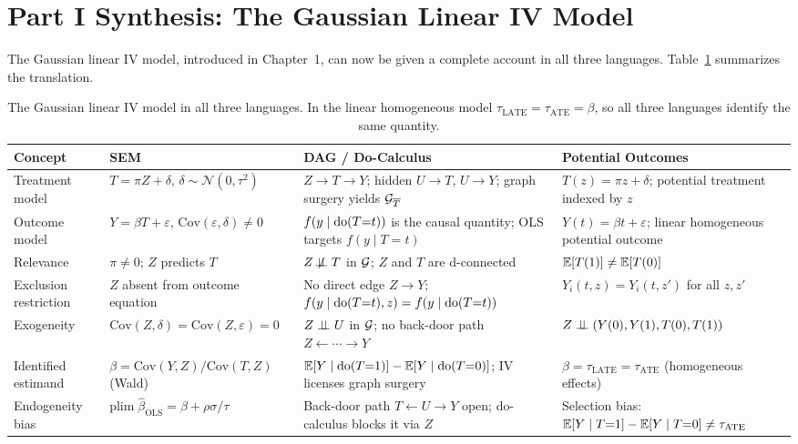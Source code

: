 \documentclass[master.tex]{subfiles}
\begin{document}
\section{Part I Synthesis: The Gaussian Linear IV Model}
\label{w4:sec:synthesis}

The Gaussian linear IV model, introduced in Chapter~1, can now be given a
complete account in all three languages.  Table~\ref{w4:tab:synthesis}
summarizes the translation.

\begin{table}[h]
\centering
\small
\renewcommand{\arraystretch}{1.5}
\begin{tabular}{@{}p{2.6cm}p{3.6cm}p{4.2cm}p{3.6cm}@{}}
\toprule
\textbf{Concept}
  & \textbf{SEM}
  & \textbf{DAG / Do-Calculus}
  & \textbf{Potential Outcomes} \\
\midrule
Treatment model
  & $T = \pi Z + \delta$,\; $\delta \sim \mathcal{N}(0,\tau^2)$
  & $Z\to T\to Y$; hidden $U\to T$, $U\to Y$; graph surgery yields $\mathcal{G}_{\overline{T}}$
  & $T(z) = \pi z + \delta$; potential treatment indexed by $z$ \\
Outcome model
  & $Y = \beta T + \varepsilon$,\; $\mathrm{Cov}(\varepsilon,\delta)\neq 0$
  & $f(y\mid\mathrm{do}(T{=}t))$ is the causal quantity; OLS targets $f(y\mid T{=}t)$
  & $Y(t) = \beta t + \varepsilon$; linear homogeneous potential outcome \\
Relevance
  & $\pi \neq 0$; $Z$ predicts $T$
  & $Z \not\!\perp\!\!\!\perp T$ in $\mathcal{G}$; $Z$ and $T$ are d-connected
  & $\mathbb{E}[T(1)] \neq \mathbb{E}[T(0)]$ \\
Exclusion restriction
  & $Z$ absent from outcome equation
  & No direct edge $Z\to Y$;\; $f(y\mid\mathrm{do}(T{=}t),z) = f(y\mid\mathrm{do}(T{=}t))$
  & $Y_i(t, z) = Y_i(t, z')$ for all $z, z'$ \\
Exogeneity
  & $\mathrm{Cov}(Z,\delta) = \mathrm{Cov}(Z,\varepsilon) = 0$
  & $Z \perp\!\!\!\perp U$ in $\mathcal{G}$; no back-door path $Z\leftarrow\cdots\to Y$
  & $Z \perp\!\!\!\perp (Y(0), Y(1), T(0), T(1))$ \\
Identified estimand
  & $\beta = \mathrm{Cov}(Y,Z)/\mathrm{Cov}(T,Z)$ (Wald)
  & $\mathbb{E}[Y\mid\mathrm{do}(T{=}1)] - \mathbb{E}[Y\mid\mathrm{do}(T{=}0)]$; IV licenses graph surgery
  & $\beta = \tau_{\mathrm{LATE}} = \tau_{\mathrm{ATE}}$ (homogeneous effects) \\
Endogeneity bias
  & $\mathrm{plim}\;\hat\beta_{\mathrm{OLS}} = \beta + \rho\sigma/\tau$
  & Back-door path $T\leftarrow U\to Y$ open; do-calculus blocks it via $Z$
  & Selection bias: $\mathbb{E}[Y\mid T{=}1] - \mathbb{E}[Y\mid T{=}0] \neq \tau_{\mathrm{ATE}}$ \\
\bottomrule
\end{tabular}
\caption{The Gaussian linear IV model in all three languages.  In the
linear homogeneous model $\tau_{\mathrm{LATE}} = \tau_{\mathrm{ATE}} = \beta$,
so all three languages identify the same quantity.}
\label{w4:tab:synthesis}
\end{table}
\end{document}
